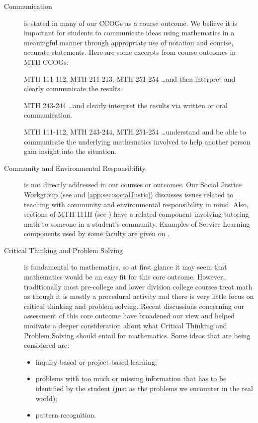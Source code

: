 \begin{description}
\item[Communication] is stated in many of our CCOGs as a course outcome. We
  believe it is important for students to communicate ideas using mathematics in
  a meaningful manner through appropriate use of notation and concise, accurate
  statements.  Here are some excerpts from course outcomes in MTH CCOGs: 
\begin{aquote}{MTH 111-112, MTH 211-213, MTH 251-254}
{\ldots}and then interpret and clearly communicate the results. 
\end{aquote}

\begin{aquote}{MTH 243-244}
{\ldots}and clearly interpret the results via written or oral communication. 
\end{aquote}

\begin{aquote}{MTH 111-112, MTH 243-244, MTH 251-254}
{\ldots}understand and be able to communicate the underlying mathematics
involved to help another person gain insight into the situation.
\end{aquote}

\item[Community and Environmental Responsibility] is not directly addressed in
  our courses or outcomes. Our Social Justice Workgroup
  (see  and \vref{app:sec:socialJustic}) discusses issues
  related to teaching with community and environmental responsibility in mind.
  Also, sections of MTH 111H (see ) have a related component
  involving tutoring math to someone in a student's community. Examples of 
  Service Learning components used by some faculty are given on .

\item[Critical Thinking and Problem Solving] is fundamental to mathematics, so
  at first glance it may seem that mathematics would be an easy fit for this
  core outcome.  However, traditionally most pre-college and lower division
  college courses treat math as though it is mostly a procedural activity and
  there is very little focus on critical thinking and problem solving.  Recent
  discussions concerning our assessment of this core outcome have broadened our
  view and helped motivate a deeper consideration about what Critical Thinking
  and Problem Solving should entail for mathematics.  Some ideas that are being
  considered are:
\begin{itemize}
\item inquiry-based or project-based learning;
\item problems with too much or missing information that has to be identified
  by the student (just as the problems we encounter in the real world);
\item pattern recognition.
\end{itemize}


\end{description}
